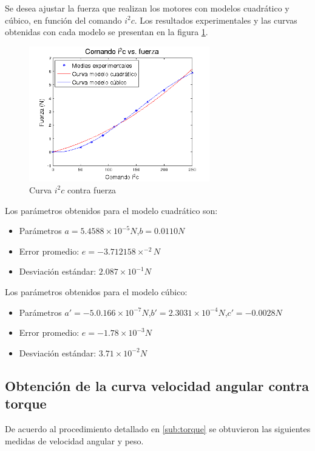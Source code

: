 \documentclass[main]{subfiles}
\begin{document}
Se desea ajustar la fuerza que realizan los motores con modelos cuadr\'atico y c\'ubico, en funci\'on del comando $i^2c$. Los resultados experimentales y las curvas obtenidas con cada modelo se presentan en la figura \ref{fig:if}.

\begin{figure}[h!]
  \begin{center}
	\includegraphics[width=0.7\textwidth]{./pics_motores/if.png}
  \end{center}
  \caption{Curva $i^2c$ contra fuerza}
  \label{fig:if}
\end{figure}
Los par\'ametros obtenidos para el modelo cuadr\'atico son:
	\begin{itemize}
	\item Par\'ametros $a=5.4588\times 10^{-5}N$,$b=0.0110N$
	\item Error promedio: $e= -3.712158\times ^{-2}N$
	\item Desviaci\'on est\'andar: $2.087\times 10^{-1}N$
	\end{itemize}
Los par\'ametros obtenidos para el modelo c\'ubico:
	\begin{itemize}
	\item Par\'ametros $a\prime=-5.0.166\times 10^{-7}N$,$b\prime=2.3031\times 10^{-4}N$,$c\prime=-0.0028N$
	\item Error promedio: $e=-1.78\times10^{-3}N$	
	\item Desviaci\'on est\'andar: $3.71\times 10^{-2}N$
	\end{itemize}		


\subsection{Obtenci\'on de la curva velocidad angular contra torque}

De acuerdo al procedimiento detallado en \ref{sub:torque} se obtuvieron las siguientes medidas de velocidad angular y peso.
\end{document}
